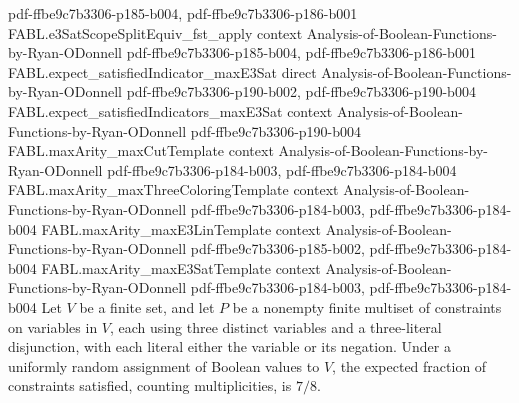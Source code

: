 \begin{theorem}
  {pdf-ffbe9c7b3306-p185-b004,
    pdf-ffbe9c7b3306-p186-b001}
\proofstep
  {FABL.e3SatScopeSplitEquiv_fst_apply}
  {context}
  {Analysis-of-Boolean-Functions-by-Ryan-ODonnell}
  {pdf-ffbe9c7b3306-p185-b004,
    pdf-ffbe9c7b3306-p186-b001}
\proofstep
  {FABL.expect_satisfiedIndicator_maxE3Sat}
  {direct}
  {Analysis-of-Boolean-Functions-by-Ryan-ODonnell}
  {pdf-ffbe9c7b3306-p190-b002,
    pdf-ffbe9c7b3306-p190-b004}
\proofstep
  {FABL.expect_satisfiedIndicators_maxE3Sat}
  {context}
  {Analysis-of-Boolean-Functions-by-Ryan-ODonnell}
  {pdf-ffbe9c7b3306-p190-b004}
\proofstep
  {FABL.maxArity_maxCutTemplate}
  {context}
  {Analysis-of-Boolean-Functions-by-Ryan-ODonnell}
  {pdf-ffbe9c7b3306-p184-b003,
    pdf-ffbe9c7b3306-p184-b004}
\proofstep
  {FABL.maxArity_maxThreeColoringTemplate}
  {context}
  {Analysis-of-Boolean-Functions-by-Ryan-ODonnell}
  {pdf-ffbe9c7b3306-p184-b003,
    pdf-ffbe9c7b3306-p184-b004}
\proofstep
  {FABL.maxArity_maxE3LinTemplate}
  {context}
  {Analysis-of-Boolean-Functions-by-Ryan-ODonnell}
  {pdf-ffbe9c7b3306-p185-b002,
    pdf-ffbe9c7b3306-p184-b004}
\proofstep
  {FABL.maxArity_maxE3SatTemplate}
  {context}
  {Analysis-of-Boolean-Functions-by-Ryan-ODonnell}
  {pdf-ffbe9c7b3306-p184-b003,
    pdf-ffbe9c7b3306-p184-b004}
Let $V$ be a finite set, and let $P$ be a nonempty finite multiset of constraints on
variables in $V$, each using three distinct variables and a three-literal disjunction,
with each literal either the variable or its negation. Under a uniformly random
assignment of Boolean values to $V$, the expected fraction of constraints satisfied,
counting multiplicities, is $7/8$.
\end{theorem}

